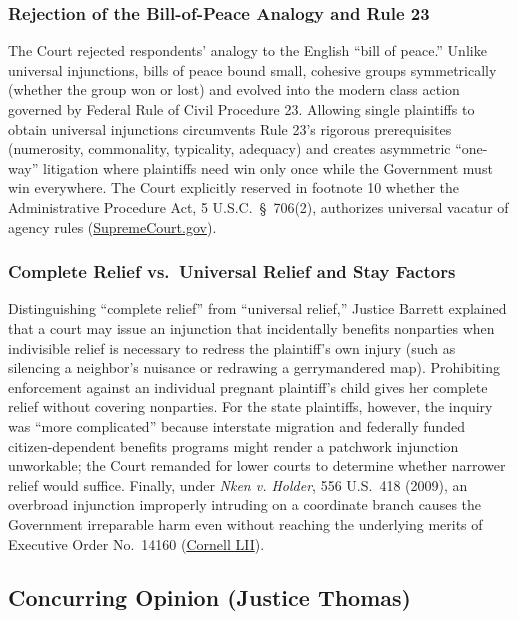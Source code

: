 \documentclass[12pt]{article}
\begin{document}
\subsubsection{Rejection of the Bill-of-Peace Analogy and Rule 23}

The Court rejected respondents' analogy to the English ``bill of peace.'' Unlike universal injunctions, bills of peace bound small, cohesive groups symmetrically (whether the group won or lost) and evolved into the modern class action governed by Federal Rule of Civil Procedure 23. Allowing single plaintiffs to obtain universal injunctions circumvents Rule 23's rigorous prerequisites (numerosity, commonality, typicality, adequacy) and creates asymmetric ``one-way'' litigation where plaintiffs need win only once while the Government must win everywhere. The Court explicitly reserved in footnote 10 whether the Administrative Procedure Act, 5 U.S.C.\ \S\ 706(2), authorizes universal vacatur of agency rules (\href{https://www.supremecourt.gov/opinions/24pdf/606us2r66_j426.pdf}{SupremeCourt.gov}).

\subsubsection{Complete Relief vs.\ Universal Relief and Stay Factors}

Distinguishing ``complete relief'' from ``universal relief,'' Justice Barrett explained that a court may issue an injunction that incidentally benefits nonparties when indivisible relief is necessary to redress the plaintiff's own injury (such as silencing a neighbor's nuisance or redrawing a gerrymandered map). Prohibiting enforcement against an individual pregnant plaintiff's child gives her complete relief without covering nonparties. For the state plaintiffs, however, the inquiry was ``more complicated'' because interstate migration and federally funded citizen-dependent benefits programs might render a patchwork injunction unworkable; the Court remanded for lower courts to determine whether narrower relief would suffice. Finally, under \textit{Nken v. Holder}, 556 U.S.\ 418 (2009), an overbroad injunction improperly intruding on a coordinate branch causes the Government irreparable harm even without reaching the underlying merits of Executive Order No.\ 14160 (\href{https://www.law.cornell.edu/supremecourt/text/24A884}{Cornell LII}).

\subsection{Concurring Opinion (Justice Thomas)}
\end{document}
